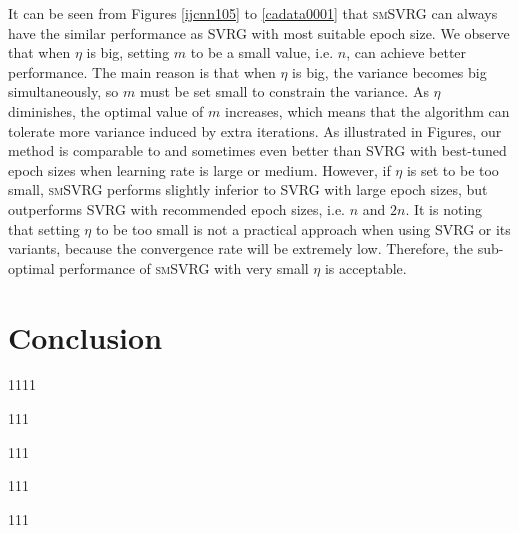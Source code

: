 \documentclass[conference]{IEEEtran}
\begin{document}
It can be seen from Figures \ref{ijcnn105} to \ref{cadata0001} that \textsc{smSVRG} can always have the similar performance as SVRG with most suitable epoch size. We observe that when $\eta$ is big, setting $m$ to be a small value, i.e. $n$, can achieve better performance. The main reason is that when $\eta$ is big, the variance becomes big simultaneously, so $m$ must be set  small to constrain the variance. As $\eta$ diminishes, the optimal value of $m$ increases, which means that the algorithm can tolerate more variance induced by extra iterations. As illustrated in Figures, our method is comparable to and sometimes even better than SVRG with best-tuned epoch sizes when learning rate is large or medium. However, if $\eta$ is set to be too small, \textsc{smSVRG} performs slightly inferior to  SVRG with large epoch sizes, but outperforms SVRG with recommended epoch sizes, i.e. $n$ and $2n$. It is noting that setting $\eta$ to be too small is not a practical approach when using SVRG or its variants, because the convergence rate will be extremely low. Therefore, the sub-optimal performance of \textsc{smSVRG} with very small $\eta$ is acceptable.
 

 

\section{Conclusion}
1111

111

111

111

111






%
%
%


\newpage




\end{document}
